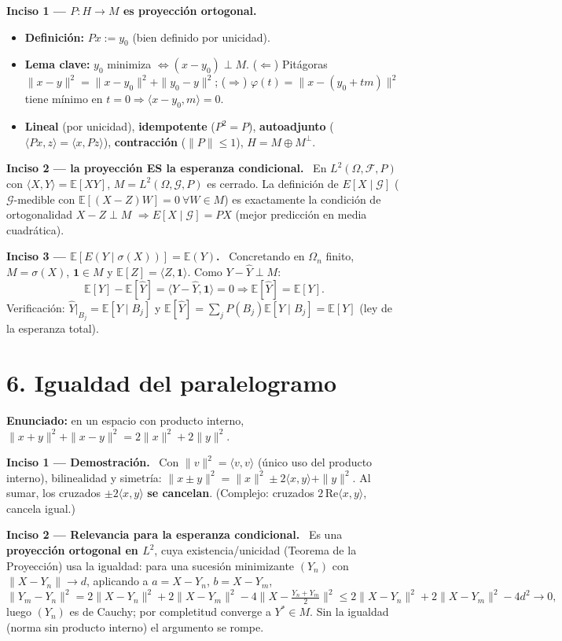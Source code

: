 \documentclass[11pt]{article}
\newcommand{\E}{\mathbb{E}}
\newcommand{\Om}{\Omega_n}
\newcommand{\sg}{\sigma}
\newcommand{\inc}[1]{\smallskip\noindent\textbf{\color{blue!30!black}#1}\ }
\begin{document}
\inc{Inciso 1 — $P:H\to M$ es proyección ortogonal.}
\begin{itemize}[leftmargin=1.4em,itemsep=1pt]
\item \textbf{Definición:} $Px:=y_0$ (bien definido por unicidad).
\item \textbf{Lema clave:} $y_0$ minimiza $\iff(x-y_0)\perp M$. ($\Leftarrow$) Pitágoras
$\|x-y\|^2=\|x-y_0\|^2+\|y_0-y\|^2$; ($\Rightarrow$) $\varphi(t)=\|x-(y_0+tm)\|^2$ tiene mínimo en
$t=0\Rightarrow\langle x-y_0,m\rangle=0$.
\item \textbf{Lineal} (por unicidad), \textbf{idempotente} ($P^2=P$), \textbf{autoadjunto}
($\langle Px,z\rangle=\langle x,Pz\rangle$), \textbf{contracción} ($\|P\|\le1$), $H=M\oplus M^\perp$.
\end{itemize}

\inc{Inciso 2 — la proyección ES la esperanza condicional.} En $L^2(\Omega,\mathcal F,P)$ con
$\langle X,Y\rangle=\E[XY]$, $M=L^2(\Omega,\mathcal G,P)$ es cerrado. La definición de $E[X\mid\mathcal G]$
($\mathcal G$-medible con $\E[(X-Z)W]=0\ \forall W\in M$) es exactamente la condición de ortogonalidad
$X-Z\perp M$ $\Rightarrow E[X\mid\mathcal G]=PX$ (mejor predicción en media cuadrática).

\inc{Inciso 3 — $\E[E(Y\mid\sg(X))]=\E(Y)$.} Concretando en $\Om$ finito, $M=\sg(X)$, $\mathbf 1\in M$ y
$\E[Z]=\langle Z,\mathbf 1\rangle$. Como $Y-\hat Y\perp M$:
\[ \E[Y]-\E[\hat Y]=\langle Y-\hat Y,\mathbf 1\rangle=0\Rightarrow\E[\hat Y]=\E[Y]. \]
Verificación: $\hat Y|_{B_j}=\E[Y\mid B_j]$ y $\E[\hat Y]=\sum_j P(B_j)\E[Y\mid B_j]=\E[Y]$ (ley de la esperanza total).

\section*{6. Igualdad del paralelogramo}
\textbf{Enunciado:} en un espacio con producto interno, $\|x+y\|^2+\|x-y\|^2=2\|x\|^2+2\|y\|^2$.

\inc{Inciso 1 — Demostración.} Con $\|v\|^2=\langle v,v\rangle$ (único uso del producto interno),
bilinealidad y simetría: $\|x\pm y\|^2=\|x\|^2\pm2\langle x,y\rangle+\|y\|^2$. Al sumar, los cruzados
$\pm2\langle x,y\rangle$ \textbf{se cancelan}. (Complejo: cruzados $2\,\mathrm{Re}\langle x,y\rangle$, cancela igual.)

\inc{Inciso 2 — Relevancia para la esperanza condicional.} Es una \textbf{proyección ortogonal en $L^2$},
cuya existencia/unicidad (Teorema de la Proyección) usa la igualdad: para una sucesión minimizante $(Y_n)$
con $\|X-Y_n\|\to d$, aplicando a $a=X-Y_n$, $b=X-Y_m$,
\[ \|Y_m-Y_n\|^2=2\|X-Y_n\|^2+2\|X-Y_m\|^2-4\Big\|X-\tfrac{Y_n+Y_m}{2}\Big\|^2\le 2\|X-Y_n\|^2+2\|X-Y_m\|^2-4d^2\to0, \]
luego $(Y_n)$ es de Cauchy; por completitud converge a $Y^*\in M$. Sin la igualdad (norma sin producto
interno) el argumento se rompe.
\end{document}

